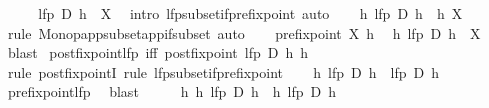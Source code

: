\begin{isabellebody}
\ \ \isamarkupfalse%
\ \isamarkupfalse%
\ {\isachardoublequoteopen}lfp\ D\ h\ {\isasymsubseteq}\ X{\isachardoublequoteclose}\ \isamarkupfalse%
\ {\isacharparenleft}{\kern0pt}intro\ lfp{\isacharunderscore}{\kern0pt}subset{\isacharunderscore}{\kern0pt}if{\isacharunderscore}{\kern0pt}prefixpoint{\isacharparenright}{\kern0pt}\ auto\isanewline
\ \ \isamarkupfalse%
\ {\isachardoublequoteopen}h\ {\isacharparenleft}{\kern0pt}lfp\ D\ h{\isacharparenright}{\kern0pt}\ {\isasymsubseteq}\ h\ X{\isachardoublequoteclose}\ \isamarkupfalse%
\ {\isacharparenleft}{\kern0pt}rule\ Monop{\isacharunderscore}{\kern0pt}app{\isacharunderscore}{\kern0pt}subset{\isacharunderscore}{\kern0pt}app{\isacharunderscore}{\kern0pt}if{\isacharunderscore}{\kern0pt}subset{\isacharparenright}{\kern0pt}\ auto\isanewline
\ \ \isamarkupfalse%
\ {\isacartoucheopen}prefixpoint\ X\ h{\isacartoucheclose}\ \isamarkupfalse%
\ {\isachardoublequoteopen}h\ {\isacharparenleft}{\kern0pt}lfp\ D\ h{\isacharparenright}{\kern0pt}\ {\isasymsubseteq}\ X{\isachardoublequoteclose}\ \isamarkupfalse%
\ blast\isanewline
{}\isamarkupfalse%
%
\endisatagproof
{\isafoldproof}%
%
\isadelimproof
\isanewline
%
\endisadelimproof
\isanewline
{}\isamarkupfalse%
\ postfixpoint{\isacharunderscore}{\kern0pt}lfp\ {\isacharbrackleft}{\kern0pt}iff{\isacharbrackright}{\kern0pt}{\isacharcolon}{\kern0pt}\ {\isachardoublequoteopen}postfixpoint\ {\isacharparenleft}{\kern0pt}lfp\ D\ h{\isacharparenright}{\kern0pt}\ h{\isachardoublequoteclose}\isanewline
%
\isadelimproof
%
\endisadelimproof
%
\isatagproof
{}\isamarkupfalse%
\ {\isacharparenleft}{\kern0pt}rule\ postfixpointI{\isacharcomma}{\kern0pt}\ rule\ lfp{\isacharunderscore}{\kern0pt}subset{\isacharunderscore}{\kern0pt}if{\isacharunderscore}{\kern0pt}prefixpoint{\isacharparenright}{\kern0pt}\isanewline
\ \ \isamarkupfalse%
\ {\isachardoublequoteopen}h\ {\isacharparenleft}{\kern0pt}lfp\ D\ h{\isacharparenright}{\kern0pt}\ {\isasymsubseteq}\ lfp\ D\ h{\isachardoublequoteclose}\ \isamarkupfalse%
\ prefixpoint{\isacharunderscore}{\kern0pt}lfp\ \isamarkupfalse%
\ blast\isanewline
\ \ \isamarkupfalse%
\ \isamarkupfalse%
\ {\isachardoublequoteopen}h\ {\isacharparenleft}{\kern0pt}h\ {\isacharparenleft}{\kern0pt}lfp\ D\ h{\isacharparenright}{\kern0pt}{\isacharparenright}{\kern0pt}\ {\isasymsubseteq}\ h\ {\isacharparenleft}{\kern0pt}lfp\ D\ h{\isacharparenright}{\kern0pt}{\isachardoublequoteclose}\isanewline

\end{isabellebody}
